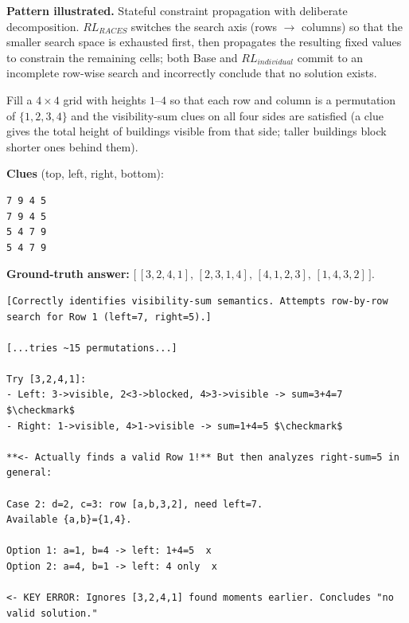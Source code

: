 \textbf{Pattern illustrated.} Stateful constraint propagation with
deliberate decomposition. $RL_{RACES}$ switches the search axis
(rows $\to$ columns) so that the smaller search space is exhausted
first, then propagates the resulting fixed values to constrain the
remaining cells; both Base and $RL_{individual}$ commit to an
incomplete row-wise search and incorrectly conclude that no solution
exists.

\smallskip
\begin{tcolorbox}[
  enhanced, breakable, width=\linewidth,
  colback=gray!5, colframe=gray!50,
  title={Problem, Sum Skyscraper $4{\times}4$},
  fonttitle=\bfseries\sffamily, coltitle=black
]
Fill a $4\times 4$ grid with heights $1$--$4$ so that each row and
column is a permutation of $\{1,2,3,4\}$ and the visibility-sum
clues on all four sides are satisfied (a clue gives the total height
of buildings visible from that side; taller buildings block shorter
ones behind them).

\smallskip
\textbf{Clues} (top, left, right, bottom):
\begin{verbatim}
7 9 4 5
7 9 4 5
5 4 7 9
5 4 7 9
\end{verbatim}

\smallskip
\textbf{Ground-truth answer:}
$\bigl[\,[3,2,4,1],\,[2,3,1,4],\,[4,1,2,3],\,[1,4,3,2]\,\bigr]$.
\end{tcolorbox}

\smallskip
\begin{tcolorbox}[
  enhanced, breakable, width=\linewidth,
  colback=red!3, colframe=red!40,
  title={\textbf{Base}, visibility assumption error in row-wise casework},
  fonttitle=\sffamily, coltitle=black
]
\begin{Verbatim}[fontsize=\footnotesize, breaklines, breakanywhere]
[Correctly identifies visibility-sum semantics. Attempts row-by-row search for Row 1 (left=7, right=5).]

[...tries ~15 permutations...]

Try [3,2,4,1]:
- Left: 3->visible, 2<3->blocked, 4>3->visible -> sum=3+4=7 $\checkmark$
- Right: 1->visible, 4>1->visible -> sum=1+4=5 $\checkmark$

**<- Actually finds a valid Row 1!** But then analyzes right-sum=5 in general:

Case 2: d=2, c=3: row [a,b,3,2], need left=7.
Available {a,b}={1,4}.

Option 1: a=1, b=4 -> left: 1+4=5  x 
Option 2: a=4, b=1 -> left: 4 only  x 

<- KEY ERROR: Ignores [3,2,4,1] found moments earlier. Concludes "no valid solution."
\end{Verbatim}
\end{tcolorbox}

